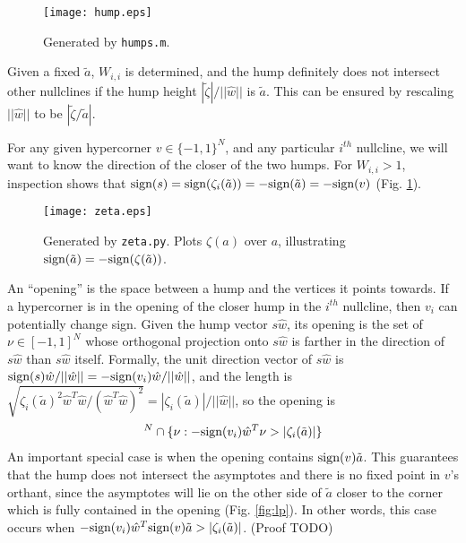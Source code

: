 \documentclass[pdftex,12pt,letterpaper]{article}
\newcommand{\sign}{\text{\upshape{sign}}}
\begin{document}
\begin{figure}
\centering
\texttt{[image: hump.eps]}
\caption{Generated by \texttt{humps.m}.}
\end{figure}

Given a fixed $\tilde{a}$, $W_{i,i}$ is determined, and the hump definitely does not intersect other nullclines if the hump height $|\tilde{\zeta}|/||\hat{w}||$ is $\tilde{a}$.  This can be ensured by rescaling $||\hat{w}||$ to be $|\tilde{\zeta}/\tilde{a}|$.

For any given hypercorner $v \in \{-1,1\}^N$, and any particular $i^{th}$ nullcline, we will want to know the direction of the closer of the two humps.  For $W_{i,i}>1$, inspection shows that $\sign(s) = \sign(\zeta_i(\tilde{a})) = -\sign(\tilde{a}) = -\sign(v)$ (Fig. \ref{fig:zeta}).

\begin{figure}
\centering
\texttt{[image: zeta.eps]}
\caption{Generated by \texttt{zeta.py}.  Plots $\zeta(a)$ over $a$, illustrating $\sign(\tilde{a}) = -\sign(\zeta(\tilde{a}))$.}
\label{fig:zeta}
\end{figure}


An ``opening'' is the space between a hump and the vertices it points towards.  If a hypercorner is in the opening of the closer hump in the $i^{th}$ nullcline, then $v_i$ can potentially change sign.  Given the hump vector $s\hat{w}$, its opening is the set of $\nu\in[-1,1]^N$ whose orthogonal projection onto $s\hat{w}$ is farther in the direction of $s\hat{w}$ than $s\hat{w}$ itself. Formally, the unit direction vector of $s\hat{w}$ is $\sign(s)\hat{w}/||\hat{w}|| = -\sign(v_i)\hat{w}/||\hat{w}||$, and the length is $\sqrt{\zeta_i(\tilde{a})^2\hat{w}^T\hat{w}/(\hat{w}^T\hat{w})^2} = |\zeta_i(\tilde{a})|/||\hat{w}||$, so the opening is
\begin{align}
[-1,1]^N \cap \{\nu : -\sign(v_i)\hat{w}^T\nu > |\zeta_i(\tilde{a})| \}
\end{align}
An important special case is when the opening contains $\sign(v)\tilde{a}$.  This guarantees that the hump does not intersect the asymptotes and there is no fixed point in $v$'s orthant, since the asymptotes will lie on the other side of $\tilde{a}$ closer to the corner which is fully contained in the opening (Fig. \ref{fig:lp}).  In other words, this case occurs when $-\sign(v_i)\hat{w}^T\sign(v)\tilde{a} > |\zeta_i(\tilde{a})|$. (Proof TODO)
\end{document}
